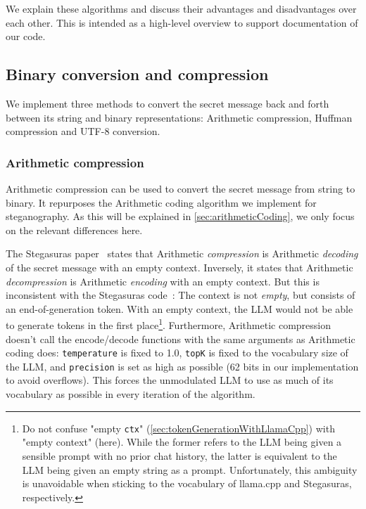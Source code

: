 We explain these algorithms and discuss their advantages and disadvantages over each other. This is intended as a high-level overview to support documentation of our code.

\subsection{Binary conversion and compression}
\label{sec:binaryConversionAndCompression}
We implement three methods to convert the secret message back and forth between its string and binary representations: Arithmetic compression, Huffman compression and UTF-8 conversion.

\subsubsection{Arithmetic compression}
\label{sec:arithmeticCompression}
Arithmetic compression can be used to convert the secret message from string to binary. It repurposes the Arithmetic coding algorithm we implement for steganography. As this will be explained in \cref{sec:arithmeticCoding}, we only focus on the relevant differences here.

The Stegasuras paper~\cite{zieglerNeuralLinguisticSteganography2019} states that Arithmetic \textit{compression} is Arithmetic \textit{decoding} of the secret message with an empty context. Inversely, it states that Arithmetic \textit{decompression} is Arithmetic \textit{encoding} with an empty context. But this is inconsistent with the Stegasuras code~\cite{zieglerHarvardnlpNeuralSteganography2025}: The context is not \textit{empty}, but consists of an end-of-generation token. With an empty context, the \gls{LLM} would not be able to generate tokens in the first place\footnote{Do not confuse "empty \lstinline|ctx|" (\cref{sec:tokenGenerationWithLlamaCpp}) with "empty context" (here). While the former refers to the \gls{LLM} being given a sensible prompt with no prior chat history, the latter is equivalent to the \gls{LLM} being given an empty string as a prompt. Unfortunately, this ambiguity is unavoidable when sticking to the vocabulary of llama.cpp and Stegasuras, respectively.}. Furthermore, Arithmetic compression doesn't call the encode/decode functions with the same arguments as Arithmetic coding does: \lstinline|temperature| is fixed to 1.0, \lstinline|topK| is fixed to the vocabulary size of the \gls{LLM}, and \lstinline|precision| is set as high as possible (62 bits in our implementation to avoid overflows). This forces the unmodulated \gls{LLM} to use as much of its vocabulary as possible in every iteration of the algorithm.

